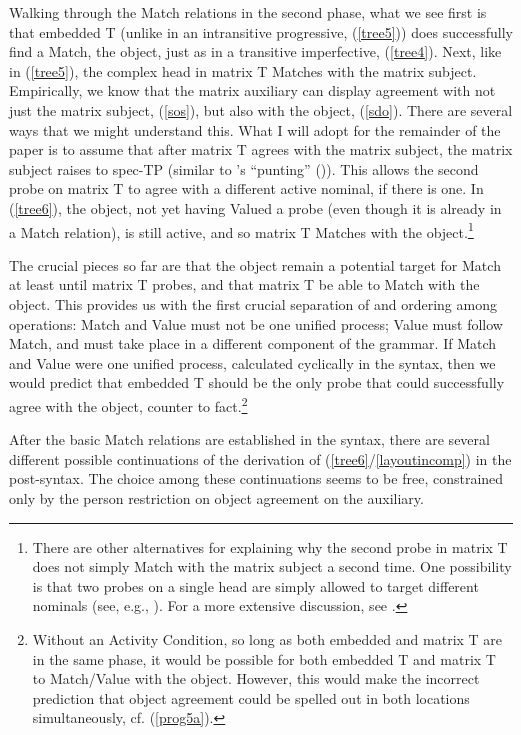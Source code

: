 \documentclass[output=paper
,modfonts
,nonflat]{langsci/langscibook}
\begin{document}
\noindent Walking through the Match relations in the second phase, what we see first is that embedded T (unlike in an intransitive progressive, (\ref{tree5})) does successfully find a Match, the object, just as in a transitive imperfective, (\ref{tree4}). Next, like in (\ref{tree5}), the complex head in matrix T Matches with the matrix subject. Empirically, we know that the matrix auxiliary can display agreement with not just the matrix subject, (\ref{sos}), but also with the object, (\ref{sdo}). There are several ways that we might understand this. What I will adopt for the remainder of the paper is to assume that after matrix T agrees with the matrix subject, the matrix subject raises to spec-TP (similar to \citeauthor{AnandNevins06}'s ``punting'' (\citeyear{AnandNevins06})). This allows the second probe on matrix T to agree with a different active nominal, if there is one. In (\ref{tree6}), the object, not yet having Valued a probe (even though it is already in a Match relation), is still active, and so matrix T Matches with the object.\footnote{There are other alternatives for explaining why the second probe in matrix T does not simply Match with the matrix subject a second time. One possibility is that two probes on a single head are simply allowed to target different nominals (see, e.g., \citealt{Keine10}). For a more extensive discussion, see \citet[fn. 12]{Georgi12}.}\largerpage[-2]

The crucial pieces so far are that the object remain a potential target for Match at least until matrix T probes, and that matrix T be able to Match with the object. This provides us with the first crucial separation of and ordering among operations: Match and Value must not be one unified process; Value must follow Match, and must take place in a different component of the grammar. If Match and Value were one unified process, calculated cyclically in the syntax, then we would predict that embedded T should be the only probe that could successfully agree with the object, counter to fact.\footnote{Without an Activity Condition, so long as both embedded and matrix T are in the same phase, it would be possible for both embedded T and matrix T to Match/Value with the object. However, this would make the incorrect prediction that object agreement could be spelled out in both locations simultaneously, cf. (\ref{prog5a}).}  

After the basic Match relations are established in the syntax, there are several different possible continuations of the derivation of (\ref{tree6}/\ref{layoutincomp}) in the post-syntax. The choice among these continuations seems to be free, constrained only by the person restriction on object agreement on the auxiliary. 
\end{document}
